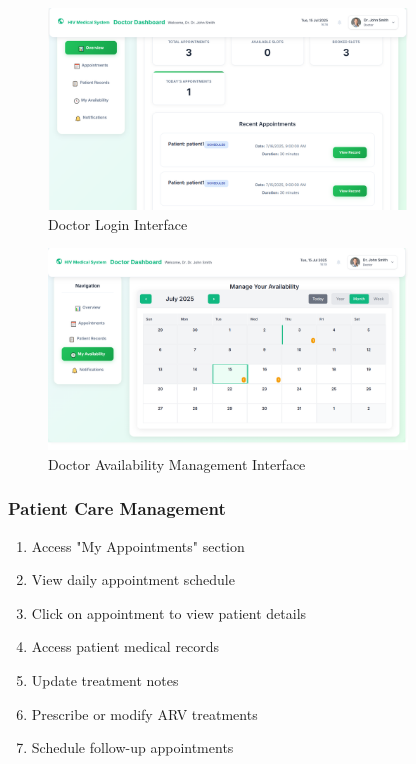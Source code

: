 \documentclass[12pt,a4paper]{article}
\begin{document}
\begin{figure}[H]
\centering
\includegraphics[width=0.85\textwidth]{doctor_login.png}
\caption{Doctor Login Interface}
\label{fig:doctor-login}
\end{figure}

\begin{figure}[H]
\centering
\includegraphics[width=0.85\textwidth]{doctor_availability.png}
\caption{Doctor Availability Management Interface}
\label{fig:doctor-availability}
\end{figure}

\subsubsection{Patient Care Management}

\begin{enumerate}
    \item Access "My Appointments" section
    \item View daily appointment schedule
    \item Click on appointment to view patient details
    \item Access patient medical records
    \item Update treatment notes
    \item Prescribe or modify ARV treatments
    \item Schedule follow-up appointments
\end{enumerate}
\end{document}
